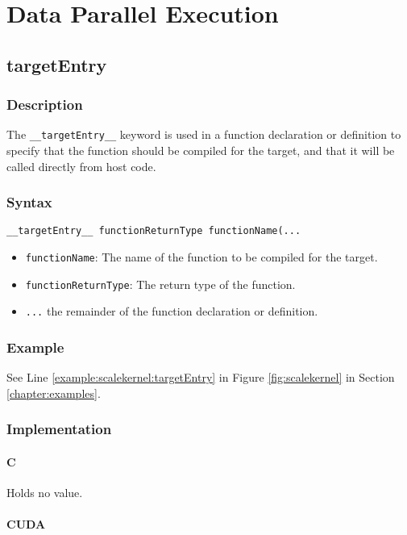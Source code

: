 \chapter{Data Parallel Execution}

\newpage
\section{targetEntry}
\subsection{Description}

The \verb+__targetEntry__+ keyword is used in a function declaration
or definition to specify that the function should be compiled for the
target, and that it will be called directly from host code.

\subsection{Syntax}
\begin{verbatim}
__targetEntry__ functionReturnType functionName(...
\end{verbatim}

\begin{itemize}
\item \verb+functionName+: The name of the function to be compiled for the target.
\item \verb+functionReturnType+: The return type of the function.
\item \verb+...+ the remainder of the function declaration or definition.
\end{itemize}


\subsection{Example}
See Line \ref{example:scalekernel:targetEntry} in Figure \ref{fig:scalekernel} in Section \ref{chapter:examples}.

\subsection{Implementation}
\subsubsection{C}
Holds no value.
\subsubsection{CUDA}


